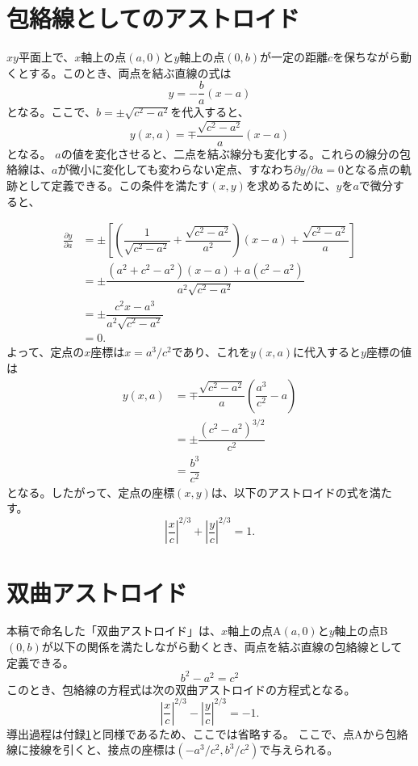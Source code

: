 \documentclass[twocolumn]{article}
\begin{document}
	
\appendix
\newcommand{\pd}[2]{{\frac{\partial #1}{\partial #2}}}
\newcommand{\ilpd}[2]{{{\partial #1}/{\partial #2}}}
\section{包絡線としてのアストロイド} \label{app:astroid}
$xy$平面上で、$x$軸上の点$(a, 0)$と$y$軸上の点$(0, b)$が一定の距離$c$を保ちながら動くとする。このとき、両点を結ぶ直線の式は
$$y=-\dfrac{b}{a}(x-a)$$
となる。ここで、$b=\pm \sqrt{c^2-a^2}$を代入すると、
$$y(x, a) = \mp \dfrac{\sqrt{c^2-a^2}}{a}(x-a)$$
となる。
$a$の値を変化させると、二点を結ぶ線分も変化する。これらの線分の包絡線は、$a$が微小に変化しても変わらない定点、すなわち$\ilpd{y}{a} = 0$となる点の軌跡として定義できる。この条件を満たす$(x, y)$を求めるために、$y$を$a$で微分すると、

$$ \begin{aligned}
	\pd{y}{a} &= \pm\left[\left( \dfrac{1}{\sqrt{c^2-a^2}}+\dfrac{\sqrt{c^2-a^2}}{a^2}\right) (x-a) + \dfrac{\sqrt{c^2-a^2}}{a} \right]\\
	&= \pm \dfrac{(a^2+c^2-a^2)(x-a)+a(c^2-a^2)}{a^2\sqrt{c^2-a^2}}\\
	&= \pm \dfrac{c^2 x - a^3}{a^2 \sqrt{c^2 - a^2}}\\
	&= 0.
\end{aligned}
$$
よって、定点の$x$座標は$x = a^3/c^2$であり、これを$y(x, a)$に代入すると$y$座標の値は
$$ \begin{aligned}
	y(x, a) &= \mp \dfrac{\sqrt{c^2-a^2}}{a}\left(\dfrac{a^3}{c^2}-a\right)\\
	& = \pm \dfrac{\left( c^2- a^2 \right)^{3/2}}{c^2}\\
	& = \dfrac{b^3}{c^2}
\end{aligned}
$$
となる。したがって、定点の座標$(x, y)$は、以下のアストロイドの式を満たす。
$$ \left|\dfrac{x}{c}\right|^{2/3} + \left|\dfrac{y}{c}\right|^{2/3} = 1. $$

\section{双曲アストロイド}\label{app:hyperastroid}
本稿で命名した「双曲アストロイド」は、$x$軸上の点A$(a, 0)$と$y$軸上の点B$(0, b)$が以下の関係を満たしながら動くとき、両点を結ぶ直線の包絡線として定義できる。
$$b^2-a^2=c^2$$
このとき、包絡線の方程式は次の双曲アストロイドの方程式となる。
$$ \left|\dfrac{x}{c}\right|^{2/3} - \left|\dfrac{y}{c}\right|^{2/3} = -1. $$
導出過程は付録\ref{app:astroid}と同様であるため、ここでは省略する。
ここで、点Aから包絡線に接線を引くと、接点の座標は$(-a^3/c^2, b^3/c^2)$で与えられる。
\end{document}
